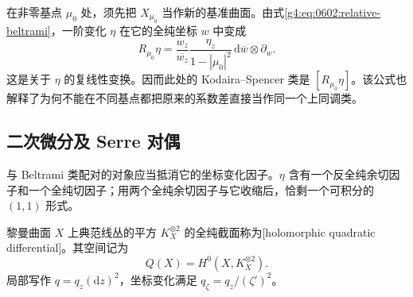 \ProseParagraphBreak

在非零基点 \(\mu_0\) 处，须先把 \(X_{\mu_0}\) 当作新的基准曲面。由式\eqref{g4:eq:0602:relative-beltrami}，一阶变化 \(\eta\) 在它的全纯坐标 \(w\) 中变成
\begin{equation}\label{g4:eq:0603:relative-tangent}
	R_{\mu_0}\eta
	=\frac{w_z}{\overline{w_z}}
	\frac{\eta_z}{1-|\mu_0|^2}\,
	\mathrm{d}\overline w\otimes\partial_w.
\end{equation}
这是关于 \(\eta\) 的复线性变换。因而此处的 Kodaira--Spencer 类是 \([R_{\mu_0}\eta]\)。该公式也解释了为何不能在不同基点都把原来的系数差直接当作同一个上同调类。

\subsection{二次微分及 Serre 对偶}
\label{g4:subsec:0603:03}

与 Beltrami 类配对的对象应当抵消它的坐标变化因子。\(\eta\) 含有一个反全纯余切因子和一个全纯切因子；用两个全纯余切因子与它收缩后，恰剩一个可积分的 \((1,1)\) 形式。

\begin{definition}\label{g4:def:0603:quadratic-differential}
	黎曼曲面 \(X\) 上典范线丛的平方 \(K_X^{\otimes2}\) 的全纯截面称为[holomorphic quadratic differential]。其空间记为
	\[
		Q(X)=H^0(X,K_X^{\otimes2}).
	\]
	局部写作 \(q=q_z(\mathrm{d}z)^2\)，坐标变化满足 \(q_\zeta=q_z/(\zeta')^2\)。
\end{definition}

